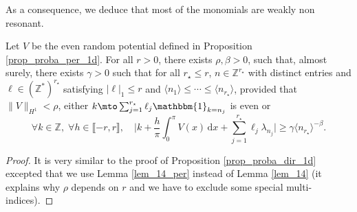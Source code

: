 As a consequence, we deduce that most of the monomials are weakly non resonant.
\begin{lemma}
\label{lem_per_nonevenok} Let $V$ be the even random potential defined in Proposition \ref{prop_proba_per_1d}. For all $r>0$, there exists $\rho,\beta>0$, such that, almost surely, there exists $\gamma>0$ such that for all $r_\star \leq r$, $n\in \mathbb{Z}^{r_\star}$ with distinct entries and $\ell \in (\mathbb{Z}^*)^{r_\star}$ satisfying $|\ell|_1 \leq r$ and $\langle n_1 \rangle \leq \cdots \leq \langle n_{r_\star} \rangle$, provided that $\| V\|_{H^1} < \rho$, either $ k \mto \sum_{j=1}^{r_\star} \ell_j \mathbbm{1}_{ k = n_j } $ is even or
\[
\forall k\in \mathbb{Z},\; \forall h\in \llbracket -r,r \rrbracket, \quad \biggl |k+\frac{h}\pi \int_0^\pi V(x) \, \mathrm{d}x + \sum_{j=1}^{r_\star} \ell_j \lambda_{n_j} \biggr|\geq \gamma \langle n_{r_\star} \rangle^{-\beta}.
\]
\end{lemma}
\begin{proof} It is very similar to the proof of Proposition \ref{prop_proba_dir_1d} excepted that we use Lemma \ref{lem_14_per} instead of Lemma \ref{lem_14} (it explains why $\rho$ depends on $r$ and we have to exclude some special multi-indices).
\end{proof}

